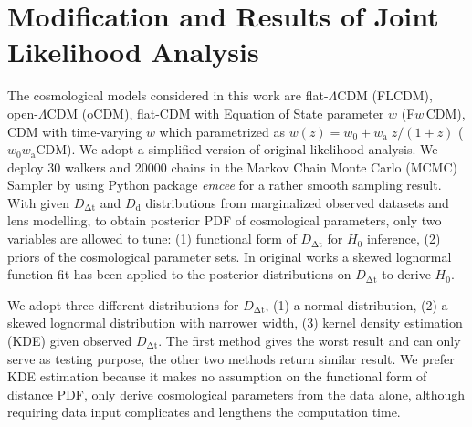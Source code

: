 \documentclass{cosmo}
\begin{document}
\section{Modification and Results of Joint Likelihood Analysis}
    The cosmological models considered in this work are flat-$\Lambda$CDM (FLCDM), open-$\Lambda$CDM (oCDM), flat-CDM with Equation of State parameter $w$ (F$w\,$CDM), CDM with time-varying $w$ which parametrized as $w(z)=w_\mathrm{0} + w_\mathrm{a}\;z/(1+z)$ ($w_\mathrm{0} w_\mathrm{a}$CDM). We adopt a simplified version of original likelihood analysis. We deploy 30 walkers and 20000 chains in the Markov Chain Monte Carlo (MCMC) Sampler by using Python package \textit{emcee} for a rather smooth sampling result. With given $D_\mathrm{\Delta t}$ and $D_\mathrm{d}$ distributions from marginalized observed datasets and lens modelling, to obtain posterior PDF of cosmological parameters, only two variables are allowed to tune: (1) functional form of $D_\mathrm{\Delta t}$ for $H_\mathrm{0}$ inference, (2) priors of the cosmological parameter sets. In original works a skewed lognormal function fit has been applied to the posterior distributions on $D_\mathrm{\Delta t}$ to derive $H_\mathrm{0}$. 
    
    We adopt three different distributions for $D_\mathrm{\Delta t}$, (1) a normal distribution, (2) a skewed lognormal distribution with narrower width, (3) kernel density estimation (KDE) given observed $D_\mathrm{\Delta t}$. The first method gives the worst result and can only serve as testing purpose, the other two methods return similar result. We prefer KDE estimation because it makes no assumption on the functional form of distance PDF, only derive cosmological parameters from the data alone, although requiring data input complicates and lengthens the computation time.
    
\end{document}

